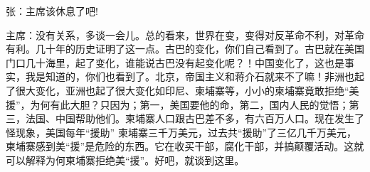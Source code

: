 张：主席该休息了吧!

主席：没有关系，多谈一会儿。总的看来，世界在变，变得对反革命不利，对革命有利。几十年的历史证明了这一点。古巴的变化，你们自己看到了。古巴就在美国门口几十海里，起了变化，谁能说古巴没有起变化呢？！中国变化了，这也是事实，我是知道的，你们也看到了。北京，帝国主义和蒋介石就来不了嘛！非洲也起了很大变化，亚洲也起了很大变化如印尼、柬埔寨等，小小的柬埔寨竟敢拒绝“美援”，为何有此大胆？只因为；第一，美国要他的命，第二，国内人民的觉悟；第三，法国、中国帮助他们。柬埔寨人口跟古巴差不多，有六百万人口。现在发生了怪现象，美国每年“援助” 柬埔寨三千万美元，过去共“援助”了三亿几千万美元，柬埔寨感到美“援”是危险的东西。它在收买干部，腐化干部，并搞颠覆活动。这就可以解释为何柬埔寨拒绝美“援”。好吧，就谈到这里。


